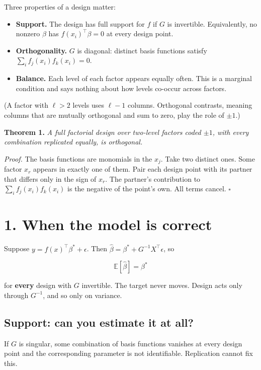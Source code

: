 \documentclass{article}
\begin{document}
Three properties of a design matter:

\begin{itemize}
\item \textbf{Support.} The design has full support for $f$ if $G$ is invertible. Equivalently, no nonzero $\beta$ has $f(x_i)^\top \beta = 0$ at every design point.
\item \textbf{Orthogonality.} $G$ is diagonal: distinct basis functions satisfy $\sum_i f_j(x_i) f_k(x_i) = 0$.
\item \textbf{Balance.} Each level of each factor appears equally often. This is a marginal condition and says nothing about how levels co-occur across factors.
\end{itemize}

(A factor with $\ell > 2$ levels uses $\ell - 1$ columns. Orthogonal contrasts, meaning columns that are mutually orthogonal and sum to zero, play the role of $\pm 1$.)

\textbf{Theorem 1.} \emph{A full factorial design over two-level factors coded $\pm 1$, with every combination replicated equally, is orthogonal.}

\emph{Proof.} The basis functions are monomials in the $x_j$. Take two distinct ones. Some factor $x_r$ appears in exactly one of them. Pair each design point with its partner that differs only in the sign of $x_r$. The partner's contribution to $\sum_i f_j(x_i) f_k(x_i)$ is the negative of the point's own. All terms cancel. $\square$

\section{1. When the model is correct}

Suppose $y = f(x)^\top \beta^* + \epsilon$. Then $\hat\beta = \beta^* + G^{-1}X^\top\epsilon$, so

\[\mathbb{E}[\hat\beta] = \beta^*\]

for \textbf{every} design with $G$ invertible. The target never moves. Design acts only through $G^{-1}$, and so only on variance.

\subsection{Support: can you estimate it at all?}

If $G$ is singular, some combination of basis functions vanishes at every design point and the corresponding parameter is not identifiable. Replication cannot fix this.
\end{document}
